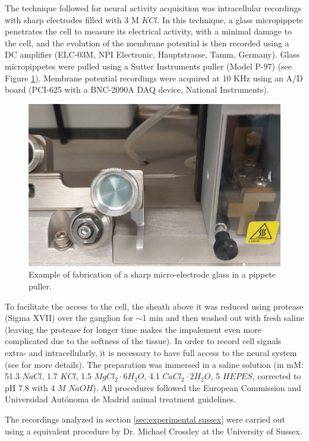 The technique followed for neural activity acquisition was intracellular recordings with sharp electrodes filled with 3 M $KCl$. %
 In this technique, a glass micropippete penetrates the cell to measure its electrical activity, with a minimal damage to the cell, and the evolution of the  membrane potential is then recorded using a DC amplifier (ELC-03M, NPI Electronic, Hauptstrasse, Tamm, Germany). Glass micropippetes were pulled using a Sutter Instruments puller (Model P-97) (see Figure \ref{fig:electrode}). Membrane potential recordings were acquired at 10 KHz using an A/D board (PCI-625 with a BNC-2090A DAQ device, National Instruments).

\begin{figure}[hbt!]
	\centering
	\includegraphics[width=0.6\linewidth]{img/methods/preparation/electrode4_zoom.jpg}
	\caption{Example of fabrication of a sharp micro-electrode glass in a pippete puller.}
	\label{fig:electrode}
\end{figure}

To facilitate the access to the cell, the sheath above it was reduced using protease (Sigma XVII) over the ganglion for $\sim$1 min and then washed out with fresh saline (leaving the protease for longer time makes the impalement even more complicated due to the softness of the tissue). In order to record cell signals extra- and intracellularly, it is necessary to have full access to the neural system (see \cite{garrido-pena_tfm_2022} for more details). The preparation was immersed in a saline solution (in mM: 51.3 $NaCl$, 1.7 $KCl$, 1.5 $MgCl_2\cdot6H_2O$, 4.1 $CaCl_2\cdot2H_2O$, 5 $HEPES$, corrected to pH 7.8 with 4 $M$ $NaOH$). All procedures followed the European Commission and Universidad Autónoma de Madrid animal treatment guidelines.

The recordings analyzed in section \ref{sec:experimental sussex} were carried out using a equivalent procedure by Dr. Michael Crossley at the University of Sussex. 


